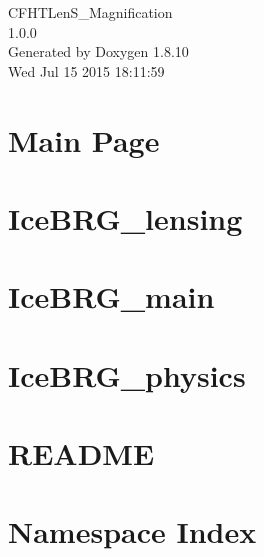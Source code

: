 \documentclass[twoside]{book}
\newcommand{\+}{\discretionary{\mbox{\scriptsize$\hookleftarrow$}}{}{}}
\newcommand{\clearemptydoublepage}{%
  \newpage{\pagestyle{empty}\cleardoublepage}%
}
\begin{document}
\hypersetup{pageanchor=false,
             bookmarks=true,
             bookmarksnumbered=true,
             pdfencoding=unicode
            }
\begin{titlepage}
\vspace*{7cm}
\begin{center}%
{\Large C\+F\+H\+T\+Len\+S\+\_\+\+Magnification \\[1ex]\large 1.\+0.\+0 }\\
\vspace*{1cm}
{\large Generated by Doxygen 1.8.10}\\
\vspace*{0.5cm}
{\small Wed Jul 15 2015 18:11:59}\\
\end{center}
\end{titlepage}
\clearemptydoublepage
\tableofcontents
\clearemptydoublepage
{}
\hypersetup{pageanchor=true}

\chapter{Main Page}
\label{index}\hypertarget{index}{}
\chapter{Ice\+B\+R\+G\+\_\+lensing}
\label{md_IceBRG_lensing}
\hypertarget{md_IceBRG_lensing}{}

\chapter{Ice\+B\+R\+G\+\_\+main}
\label{md_IceBRG_main}
\hypertarget{md_IceBRG_main}{}

\chapter{Ice\+B\+R\+G\+\_\+physics}
\label{md_IceBRG_physics}
\hypertarget{md_IceBRG_physics}{}

\chapter{R\+E\+A\+D\+M\+E}
\label{md__disk2_brg_git_Magnification_Public_README}
\hypertarget{md__disk2_brg_git_Magnification_Public_README}{}

\chapter{Namespace Index}

\end{document}
